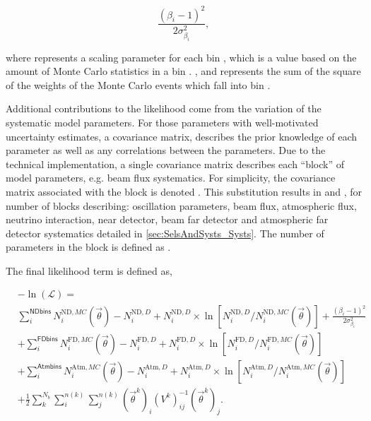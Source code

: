 \begin{equation}
  \frac{(\beta_{i}-1)^{2}}{2\sigma^{2}_{\beta_{i}}},
\end{equation}

where  represents a scaling parameter for each bin , which is a value based on the amount of Monte Carlo statistics in a bin \cite{t2k_tn_395}. , and  represents the sum of the square of the weights of the Monte Carlo events which fall into bin .

Additional contributions to the likelihood come from the variation of the systematic model parameters. For those parameters with well-motivated uncertainty estimates, a covariance matrix,  describes the prior knowledge of each parameter as well as any correlations between the parameters. Due to the technical implementation, a single covariance matrix describes each ``block'' of model parameters, e.g. beam flux systematics. For simplicity, the covariance matrix associated with the  block is denoted . This substitution results in  and , for  number of blocks describing: oscillation parameters, beam flux, atmospheric flux, neutrino interaction, near detector, beam far detector and atmospheric far detector systematics detailed in \autoref{sec:SelsAndSysts_Systs}. The number of parameters in the  block is defined as .

The final likelihood term is defined as,

\begin{align}
\label{eqn:Likelihood:Likelihood}
&-\ln(\mathcal{L}) = \\ 
& \sum_{i}^{\mathsf{ND bins}} N_{i}^{\mathrm{ND},MC}(\vec{\theta}) - N_{i}^{\mathrm{ND},D} + N_{i}^{\mathrm{ND},D}  \times \ln \left[ N_{i}^{\mathrm{ND},D}/N_{i}^{\mathrm{ND},MC}(\vec{\theta}) \right] + \frac{(\beta_{i}-1)^{2}}{2\sigma^{2}_{\beta_{i}}} \nonumber \\
& +  \sum_{i}^{\mathsf{FD bins}} N_{i}^{\mathrm{FD},MC}(\vec{\theta}) - N_{i}^{\mathrm{FD},D} + N_{i}^{\mathrm{FD},D}  \times \ln \left[ N_{i}^{\mathrm{FD},D}/N_{i}^{\mathrm{FD},MC}(\vec{\theta}) \right] \nonumber \\ 
& +  \sum_{i}^{\mathsf{Atm bins}} N_{i}^{\mathrm{Atm},MC}( \vec{\theta}) - N_{i}^{\mathrm{Atm},D} + N_{i}^{\mathrm{Atm},D} \times  \ln \left[ N_{i}^{\mathrm{Atm},D}/N_{i}^{\mathrm{Atm},MC}(\vec{\theta}) \right] \nonumber \\ 
& + \frac{1}{2} \sum_{k}^{N_{b}} \sum_{i}^{n(k)} \sum_{j}^{n(k)} (\vec{\theta}^{k})_{i} (V^{k})^{-1}_{ij} (\vec{\theta}^{k})_{j}. \nonumber
\end{align}

